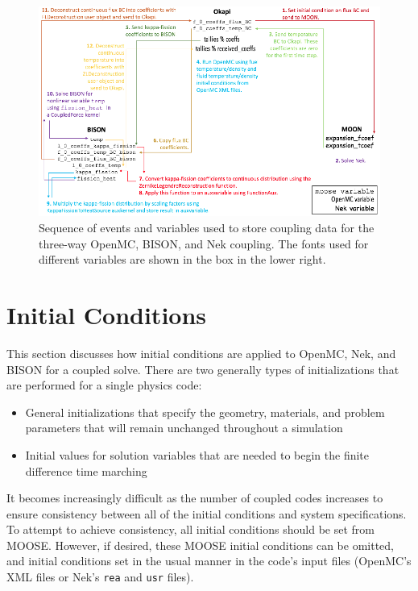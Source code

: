 \documentclass[10pt]{article}
\numberwithin{equation}{section} %
\begin{document}
\begin{figure}[H]
\centering
\includegraphics[width=17.5cm]{figures/OpenMC-BISON-Nek-step1.png}
\caption{Sequence of events and variables used to store coupling data for the three-way OpenMC, BISON, and Nek coupling. The fonts used for different variables are shown in the box in the lower right.}
\end{figure}

\clearpage
\section{Initial Conditions}
\label{sec:ICs}
This section discusses how initial conditions are applied to OpenMC, Nek, and BISON for a coupled solve. There are two generally types of initializations that are performed for a single physics code:

\begin{itemize}
\item General initializations that specify the geometry, materials, and problem parameters that will remain unchanged throughout a simulation
\item Initial values for solution variables that are needed to begin the finite difference time marching
\end{itemize}

It becomes increasingly difficult as the number of coupled codes increases to ensure consistency between all of the initial conditions and system specifications. To attempt to achieve consistency, all initial conditions should be set from MOOSE. However, if desired, these MOOSE initial conditions can be omitted, and initial conditions set in the usual manner in the code's input files (OpenMC's XML files or Nek's {\tt rea} and {\tt usr} files). 
\end{document}
